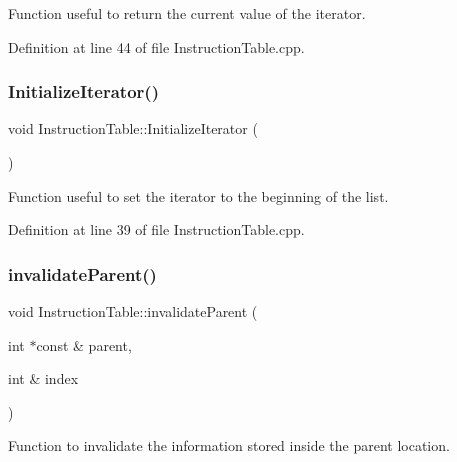 Function useful to return the current value of the iterator. 



Definition at line 44 of file Instruction\+Table.\+cpp.

\mbox{\label{classoctantis_1_1InstructionTable_a96a6fb833e0886548ae75770bad8f546}} 
\subsubsection{\texorpdfstring{Initialize\+Iterator()}{InitializeIterator()}}
{\footnotesize\ttfamily void Instruction\+Table\+::\+Initialize\+Iterator (\begin{DoxyParamCaption}{ }\end{DoxyParamCaption})}



Function useful to set the iterator to the beginning of the list. 



Definition at line 39 of file Instruction\+Table.\+cpp.

\mbox{\label{classoctantis_1_1InstructionTable_a0777d603ab5fac8ccdfea77800c40464}} 
\subsubsection{\texorpdfstring{invalidate\+Parent()}{invalidateParent()}}
{\footnotesize\ttfamily void Instruction\+Table\+::invalidate\+Parent (\begin{DoxyParamCaption}\item[{int $\ast$const \&}]{parent,  }\item[{int \&}]{index }\end{DoxyParamCaption})}



Function to invalidate the information stored inside the parent location. 



